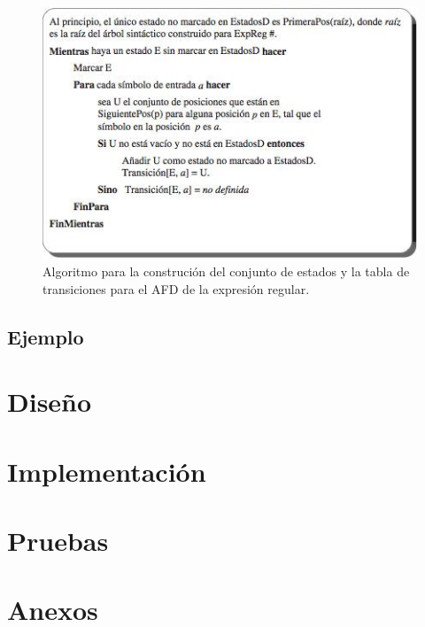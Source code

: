\documentclass{report}
\begin{document}
\begin{enumerate}
	\begin{figure}
		\centering
		\includegraphics[scale=.5]{img/tabla3.jpg}
		\caption{Algoritmo para la construción del conjunto de estados y la tabla de transiciones para el AFD de la expresión regular.}
		\label{fig:algoritmo}
	\end{figure}

\end{enumerate}

\section{Ejemplo}





\chapter{Diseño}


\chapter{Implementación}


\chapter{Pruebas}


\chapter{Anexos}
\end{document}
